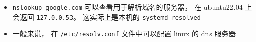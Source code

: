 
\begin{itemize}
\item \verb|nslookup google.com| 可以查看用于解析域名的服务器， 在 ubuntu22.04 上会返回 \verb|127.0.0.53|。 这实际上是本机的 \verb|systemd-resolved|
\item 一般来说， 在 \verb|/etc/resolv.conf| 文件中可以配置 linux 的 dns 服务器
\end{itemize}
